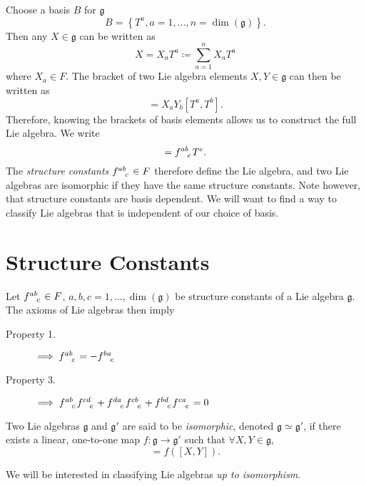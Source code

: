 Choose a basis $B$ for $\mathfrak{g}$
\begin{equation}
  B = \left\{ T^a, a=1, \ldots, n = \dim(\mathfrak{g}) \right\}.
\end{equation}
Then any $X \in \mathfrak{g}$ can be written as
\begin{equation}
  X = X_a T^a \coloneq \sum_{a=1}^n X_a T^a
\end{equation}
where $X_a \in F$. The bracket of two Lie algebra elements $X, Y \in \mathfrak{g}$ can then be written as
\begin{equation}
  [X, Y] = X_a Y_b [T^a, T^b].
\end{equation}
Therefore, knowing the brackets of basis elements allows us to construct the full Lie algebra.
We write
\begin{equation}
  [T^a, T^b] = f \indices{^a^b_c} T^c .
\end{equation}
The \emph{structure constants} $f \indices{^{ab}_c} \in F$ therefore define the Lie algebra, and two Lie algebras are isomorphic if they have the same structure constants.
Note however, that structure constants are basis dependent. We will want to find a way to classify Lie algebras that is independent of our choice of basis.

\section{Structure Constants}%
\label{sec:structure_constants}

Let $f \indices{^a^b_c} \in F$, $a, b, c = 1, \ldots, \dim(\mathfrak{g})$ be structure constants of a Lie algebra $\mathfrak{g}$.
The axioms of Lie algebras then imply
\begin{description}
  \item[Property 1.] $\implies f \indices{^a^b_c} = -f \indices{^b^a_c}$
  \item[Property 3.] $\implies f \indices{^a^b_c} f \indices{^c^d_e} + f \indices{^d^a_c} f \indices{^c^b_e} + f \indices{^b^d_c} f \indices{^c^a_e} = 0$
\end{description}

\begin{definition}[isomorphism]
  Two Lie algebras $\mathfrak{g}$ and $\mathfrak{g}'$ are said to be \emph{isomorphic}, denoted $\mathfrak{g} \simeq \mathfrak{g}'$, if there exists a linear, one-to-one map $f: \mathfrak{g} \to \mathfrak{g}'$ such that $\forall X, Y \in \mathfrak{g}$,
  \begin{equation}
    [f(X), f(Y)] = f([X, Y]).
  \end{equation}
\end{definition}
We will be interested in classifying Lie algebras \emph{up to isomorphism}.

